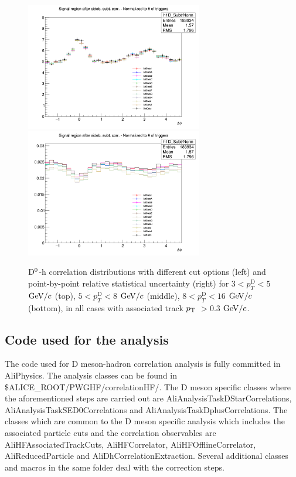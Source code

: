 \begin{figure}[!htp]
{\includegraphics[width=0.47\linewidth, height=5.6cm]{figures/Cut_Optimiz_D0/AzimCorrDistr_Dzero_Canvas_PtIntBins9to10_PoolInt_thr03to99_Superimp.png}}
{\includegraphics[width=0.47\linewidth, height=5.6cm]{figures/Cut_Optimiz_D0/Uncertanty_AzimCorrDistr_Dzero_Canvas_PtIntBins9to10_PoolInt_thr03to99.png}}

\caption{${\rm D^0}$-h correlation distributions with different cut options (left) and point-by-point relative statistical uncertainty (right) for $3< p_{T}^{\text{D}}< 5$ $\mathrm{GeV}/c$ (top), $5< p_{T}^{\text{D}}< 8$ $\mathrm{GeV}/c$ (middle), $8< p_{T}^{\text{D}}< 16$ $\mathrm{GeV}/c$ (bottom), in all cases with associated track $p_{\rm T}$ $> 0.3$ $\mathrm{GeV}/c$.}
\label{fig:cutoptD0}
\end{figure}

\subsection{Code used for the analysis}
The code used for D meson-hadron correlation analysis is fully committed in AliPhysics. The analysis classes can be found in
\$ALICE\_ROOT/PWGHF/correlationHF/.  The  D meson specific classes where the aforementioned steps are carried out are
AliAnalysisTaskDStarCorrelations, AliAnalysisTaskSED0Correlations and AliAnalysisTaskDplusCorrelations. The classes which are common to the D meson specific analysis which includes the associated particle cuts and the correlation observables are AliHFAssociatedTrackCuts, AliHFCorrelator, AliHFOfflineCorrelator, AliReducedParticle and AliDhCorrelationExtraction. Several additional classes and macros in the same folder deal with the correction steps.

